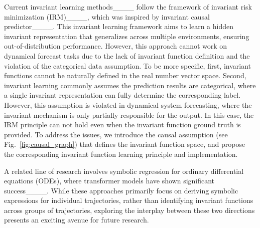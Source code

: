 Current invariant learning methods____ follow the framework of invariant risk minimization (IRM)____, which was inspired by invariant causal predictor____. This invariant learning framework aims to learn a hidden invariant representation that generalizes across multiple environments, ensuring out-of-distribution performance. However, this approach cannot work on dynamical forecast tasks due to the lack of invariant function definition and the violation of the categorical data assumption. To be more specific, first, invariant functions cannot be naturally defined in the real number vector space. Second, invariant learning commonly assumes the prediction results are categorical, where a single invariant representation can fully determine the corresponding label. However, this assumption is violated in dynamical system forecasting, where the invariant mechanism is only partially responsible for the output. In this case, the IRM principle can not hold even when the invariant function ground truth is provided. To address the issues, we introduce the causal assumption (see Fig.~\ref{fig:causal_graph}) that defines the invariant function space, and propose the corresponding invariant function learning principle and implementation.

{
A related line of research involves symbolic regression for ordinary differential equations (ODEs), where transformer models have shown significant success____. While these approaches primarily focus on deriving symbolic expressions for individual trajectories, rather than identifying invariant functions across groups of trajectories, exploring the interplay between these two directions presents an exciting avenue for future research.}

\vspace{-0.2cm}